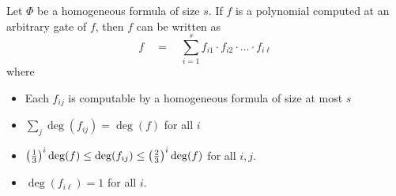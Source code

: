 \documentclass{beatcs}
\newcommand{\spaced}[1]{\quad#1\quad}
\begin{document}
\begin{lemma}[\cite{HY11a}]\label{lem:HY}
Let $\Phi$ be a homogeneous formula of size $s$. If $f$ is a polynomial computed at an arbitrary gate of $f$, then $f$ can be written as
\begin{equation}\label{eqn:vsbr-hom-form}
f \spaced{=} \sum_{i=1}^s f_{i1} \cdot f_{i2} \cdot \dots \cdot  f_{i\ell}
\end{equation}
where 
\begin{itemize}
\item Each $f_{ij}$ is computable by a homogeneous formula of size at most $s$
\item $\sum_j \deg(f_{ij}) = \deg(f)$ for all $i$
\item $\left(\frac{1}{3}\right)^i \deg(f) \leq \deg(f_{ij}) \leq \left(\frac{2}{3}\right)^i \deg(f)$ for all $i,j$. 
\item $\deg(f_{i\ell}) = 1$ for all $i$. 
\end{itemize}
\end{lemma}
\end{document}
